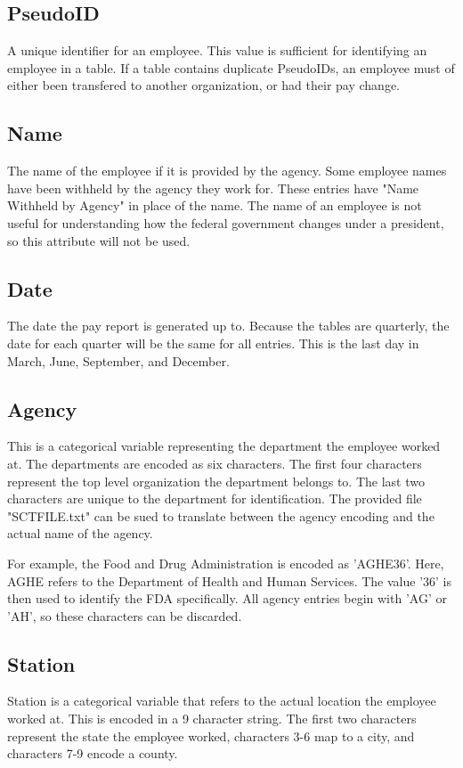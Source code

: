 \documentclass{article}
\begin{document}
    \subsection{PseudoID}
    A unique identifier for an employee. This value is sufficient for identifying an employee in a table. If a table contains duplicate PseudoIDs, an employee must of either been transfered to another organization, or had their pay change.

    \subsection{Name}
    The name of the employee if it is provided by the agency. Some employee names have been withheld by the agency they work for. These entries have "Name Withheld by Agency" in place of the name. The name of an employee is not useful for understanding how the federal government changes under a president, so this attribute will not be used.

    \subsection{Date}
    The date the pay report is generated up to. Because the tables are quarterly, the date for each quarter will be the same for all entries. This is the last day in March, June, September, and December.

    \subsection{Agency}
    This is a categorical variable representing the department the employee worked at. The departments are encoded as six characters. The first four characters represent the top level organization the department belongs to. The last two characters are unique to the department for identification. The provided file "SCTFILE.txt" can be sued to translate between the agency encoding and the actual name of the agency.
    \par
    For example, the Food and Drug Administration is encoded as 'AGHE36'. Here, AGHE refers to the Department of Health and Human Services. The value '36' is then used to identify the FDA specifically. All agency entries begin with 'AG' or 'AH', so these characters can be discarded.

    \subsection{Station}
    Station is a categorical variable that refers to the actual location the employee worked at. This is encoded in a 9 character string. The first two characters represent the state the employee worked, characters 3-6 map to a city, and characters 7-9 encode a county.
\end{document}
